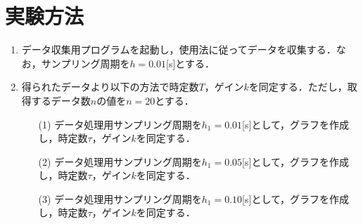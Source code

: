 \documentclass[11pt,a4paper]{jsarticle}
\begin{document}
 \section{実験方法}
 \begin{enumerate}
  \item データ収集用プログラムを起動し，使用法に従ってデータを収集する．なお，サンプリング周期を$h = 0.01$[s]とする．
  \item 得られたデータより以下の方法で時定数$T$，ゲイン$k$を同定する．ただし，取得するデータ数$n$の値を$n = 20$とする．
	\begin{itemize}
	 \item[(1)] データ処理用サンプリング周期を$h_1 = 0.01$[s]として，グラフを作成し，時定数$\tau$，ゲイン$k$を同定する．
	 \item[(2)] データ処理用サンプリング周期を$h_1 = 0.05$[s]として，グラフを作成し，時定数$\tau$，ゲイン$k$を同定する．
	 \item[(3)] データ処理用サンプリング周期を$h_1 = 0.10$[s]として，グラフを作成し，時定数$\tau$，ゲイン$k$を同定する．
	\end{itemize}
 \end{enumerate}
\end{document}
